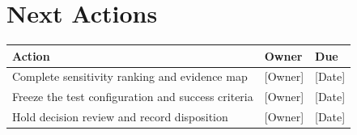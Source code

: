 \documentclass{linearspace-memo}
\begin{document}
\section{Next Actions}

\begin{tabularx}{\linewidth}{@{}X p{1.25in}p{1.0in}@{}}
  \toprule
  \textbf{Action} & \textbf{Owner} & \textbf{Due} \\
  \midrule
  Complete sensitivity ranking and evidence map & [Owner] & [Date] \\
  Freeze the test configuration and success criteria & [Owner] & [Date] \\
  Hold decision review and record disposition & [Owner] & [Date] \\
  \bottomrule
\end{tabularx}
\end{document}
